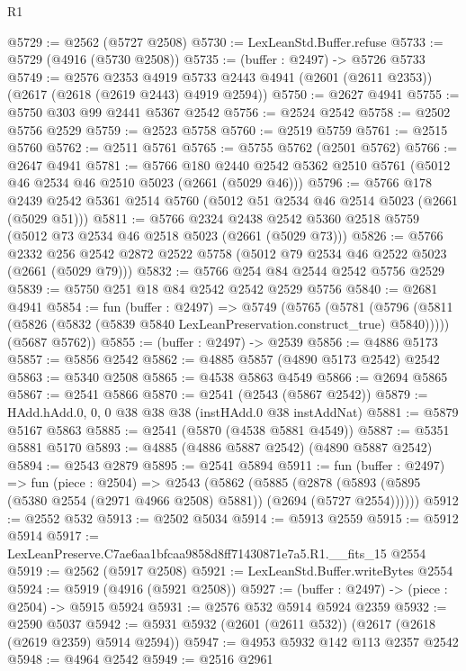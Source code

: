 \begin{lexlean}{R1}
\begin{coremodule}
@5729 := @2562 (@5727 @2508)
@5730 := LexLeanStd.Buffer.refuse
@5733 := @5729 (@4916 (@5730 @2508))
@5735 := (buffer : @2497) -> @5726 @5733
@5749 := @2576
    @2353
    @4919
    @5733
    @2443
    @4941
    (@2601 (@2611 @2353))
    (@2617 (@2618 (@2619 @2443) @4919 @2594))
@5750 := @2627 @4941
@5755 := @5750 @303 @99 @2441 @5367 @2542
@5756 := @2524 @2542
@5758 := @2502 @5756 @2529
@5759 := @2523 @5758
@5760 := @2519 @5759
@5761 := @2515 @5760
@5762 := @2511 @5761
@5765 := @5755 @5762 (@2501 @5762)
@5766 := @2647 @4941
@5781 := @5766
    @180
    @2440
    @2542
    @5362
    @2510
    @5761
    (@5012 @46 @2534 @46 @2510 @5023 (@2661 (@5029 @46)))
@5796 := @5766
    @178
    @2439
    @2542
    @5361
    @2514
    @5760
    (@5012 @51 @2534 @46 @2514 @5023 (@2661 (@5029 @51)))
@5811 := @5766
    @2324
    @2438
    @2542
    @5360
    @2518
    @5759
    (@5012 @73 @2534 @46 @2518 @5023 (@2661 (@5029 @73)))
@5826 := @5766
    @2332
    @256
    @2542
    @2872
    @2522
    @5758
    (@5012 @79 @2534 @46 @2522 @5023 (@2661 (@5029 @79)))
@5832 := @5766 @254 @84 @2544 @2542 @5756 @2529
@5839 := @5750 @251 @18 @84 @2542 @2542 @2529 @5756
@5840 := @2681 @4941
@5854 := fun (buffer : @2497) =>
  @5749
    (@5765
      (@5781 (@5796 (@5811 (@5826 (@5832 (@5839 @5840 LexLeanPreservation.construct_true) @5840)))))
      (@5687 @5762))
@5855 := (buffer : @2497) -> @2539
@5856 := @4886 @5173
@5857 := @5856 @2542
@5862 := @4885 @5857 (@4890 @5173 @2542) @2542
@5863 := @5340 @2508
@5865 := @4538 @5863 @4549
@5866 := @2694 @5865
@5867 := @2541 @5866
@5870 := @2541 (@2543 (@5867 @2542))
@5879 := HAdd.hAdd.{0, 0, 0} @38 @38 @38 (instHAdd.{0} @38 instAddNat)
@5881 := @5879 @5167 @5863
@5885 := @2541 (@5870 (@4538 @5881 @4549))
@5887 := @5351 @5881 @5170
@5893 := @4885 (@4886 @5887 @2542) (@4890 @5887 @2542)
@5894 := @2543 @2879
@5895 := @2541 @5894
@5911 := fun (buffer : @2497) =>
  fun (piece : @2504) =>
  @2543
    (@5862
      (@5885 (@2878 (@5893 (@5895 (@5380 @2554 (@2971 @4966 @2508) @5881)) (@2694 (@5727 @2554))))))
@5912 := @2552 @532
@5913 := @2502 @5034
@5914 := @5913 @2559
@5915 := @5912 @5914
@5917 := LexLeanPreserve.C7ae6aa1bfcaa9858d8ff71430871e7a5.R1.__fits_15 @2554
@5919 := @2562 (@5917 @2508)
@5921 := LexLeanStd.Buffer.writeBytes @2554
@5924 := @5919 (@4916 (@5921 @2508))
@5927 := (buffer : @2497) -> (piece : @2504) -> @5915 @5924
@5931 := @2576 @532 @5914 @5924 @2359
@5932 := @2590 @5037
@5942 := @5931 @5932 (@2601 (@2611 @532)) (@2617 (@2618 (@2619 @2359) @5914 @2594))
@5947 := @4953 @5932 @142 @113 @2357 @2542
@5948 := @4964 @2542
@5949 := @2516 @2961

\end{coremodule}
\end{lexlean}
